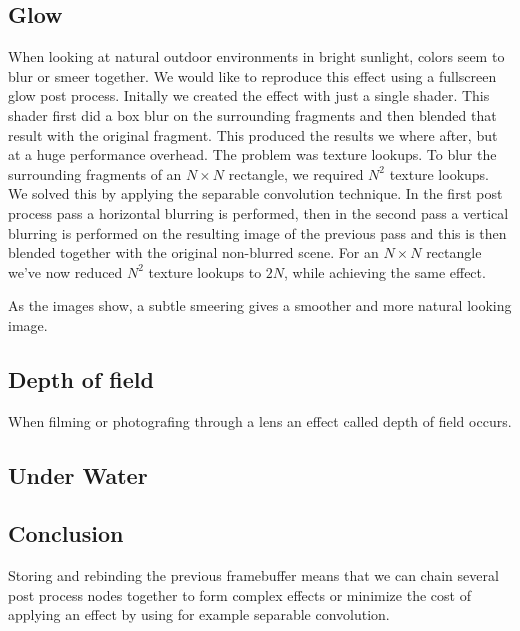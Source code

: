 

\subsection{Glow}

When looking at natural outdoor environments in bright sunlight,
colors seem to blur or smeer together. We would like to reproduce this
effect using a fullscreen glow post process. Initally we created the
effect with just a single shader. This shader first did a box blur on
the surrounding fragments and then blended that result with the
original fragment. This produced the results we where after, but at a
huge performance overhead. The problem was texture lookups. To blur
the surrounding fragments of an $N \times N$ rectangle, we required
$N^2$ texture lookups. We solved this by applying the separable
convolution technique. In the first post process pass a horizontal
blurring is performed, then in the second pass a vertical blurring is
performed on the resulting image of the previous pass and this is then
blended together with the original non-blurred scene. For an $N \times
N$ rectangle we've now reduced $N^2$ texture lookups to $2N$, while
achieving the same effect.


As the images show, a subtle smeering gives a smoother and more
natural looking image.


\subsection{Depth of field}

When filming or photografing through a lens an effect called depth of
field occurs.


\subsection{Under Water}




\subsection{Conclusion}

Storing and rebinding the previous framebuffer means that we can chain
several post process nodes together to form complex effects or
minimize the cost of applying an effect by using for example separable
convolution.





